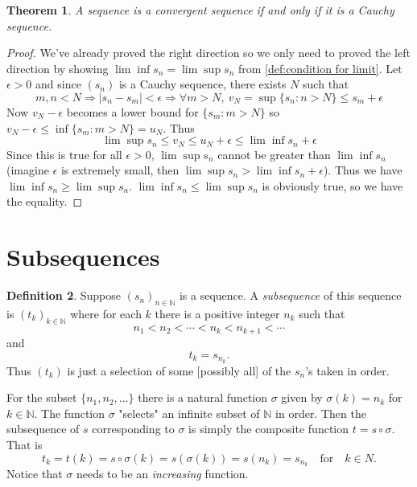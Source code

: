 \documentclass[12pt, lettersize]{book}
\theoremstyle{plain}
\newtheorem{thm}{Theorem}[section]
\theoremstyle{definition}
\newtheorem{dfn}[thm]{Definition}
\theoremstyle{remark}
\begin{document}
		\begin{thm}\label{def:cauchy iff convergent}
		A sequence is a convergent sequence if and only if it is a Cauchy sequence.
		\end{thm}
		\begin{proof}
		We've already proved the right direction so we only need to proved the left direction by showing $\lim\inf s_n=\lim\sup s_n$ from \ref{def:condition for limit}.
		Let $\epsilon>0$ and since $(s_n)$ is a Cauchy sequence, there exists $N$ such that
		\begin{displaymath}
			m,n<N \Rightarrow |s_n-s_m|<\epsilon\Rightarrow \forall m>N,\ v_N=\sup\{s_n: n>N\}\leq s_m+\epsilon
		\end{displaymath}
		Now $v_N-\epsilon$ becomes a lower bound for $\{s_m: m>N\}$ so $v_N-\epsilon\leq\inf\{s_m: m>N\}=u_N$.
		Thus
		\begin{displaymath}
			\lim\sup s_n\leq v_N\leq u_N+\epsilon\leq\lim\inf s_n+\epsilon
		\end{displaymath}
		Since this is true for all $\epsilon>0$, $\lim\sup s_n$ cannot be greater than $\lim\inf s_n$ (imagine $\epsilon$ is extremely small, then $\lim\sup s_n>\lim\inf s_n+\epsilon$). Thus we have $\lim\inf s_n\geq\lim\sup s_n$. $\lim\inf s_n\leq\lim\sup s_n$ is obviously true, so we have the equality.
		\end{proof}
		\newpage
		
	\section{Subsequences}
		\begin{dfn}
		Suppose $(s_n)_{n\in\mathbb{N}}$ is a sequence. A \emph{subsequence} of this sequence is $(t_k)_{k\in\mathbb{N}}$ where for each $k$ there is a positive integer $n_k$ such that
		\begin{equation*}
			n_1<n_2<\cdots<n_k<n_{k+1}<\cdots
		\end{equation*}
		and
		\begin{equation*}
			t_k=s_{n_k}.
		\end{equation*}
		Thus $(t_k)$ is just a selection of some [possibly all] of the $s_n$'s taken in order.
		\end{dfn}
		For the subset $\{n_1,n_2,\dots\}$ there is a natural function $\sigma$ given by $\sigma(k)=n_k$ for $k\in\mathbb{N}$. The function $\sigma$ "selects" an infinite subset of $\mathbb{N}$ in order. Then
		the subsequence of $s$ corresponding to $\sigma$ is simply the composite function $t=s\circ\sigma$. That is
		\begin{displaymath}
			t_k=t(k)=s\circ\sigma(k)=s(\sigma(k))=s(n_k)=s_{n_k}\quad\text{for}\quad k\in N.
		\end{displaymath}
		Notice that $\sigma$ needs to be an \emph{increasing} function. 
		
\end{document}
